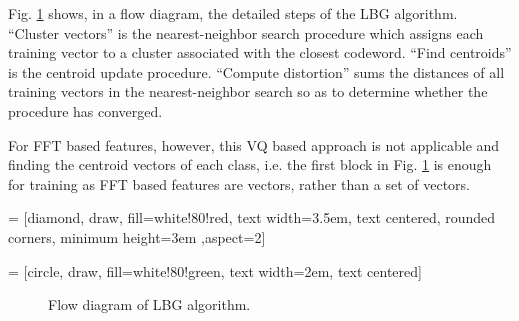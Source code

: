 \documentclass{article}
\begin{document}
Fig. \ref{fig:lbg} shows, in a flow diagram, the detailed steps of the LBG algorithm.  “Cluster vectors” is the nearest-neighbor search procedure which assigns each training vector to a cluster associated with the closest codeword.  “Find centroids” is the centroid update procedure.  “Compute distortion” sums the distances of all training vectors in the nearest-neighbor search so as to determine whether the procedure has converged.

For FFT based features, however, this VQ based approach is not applicable and finding the centroid vectors of each class, i.e. the first block in Fig. \ref{fig:lbg} is enough for training as FFT based features are vectors, rather than a set of vectors.

 = [diamond, draw, fill=white!80!red,
    text width=3.5em, text centered, rounded corners, minimum height=3em ,aspect=2]
    
 = [circle, draw, fill=white!80!green,
    text width=2em, text centered]
\begin{figure}[htb]
    \centering
    \caption{Flow diagram of LBG algorithm.}
    \label{fig:lbg}
\end{figure}
\end{document}
